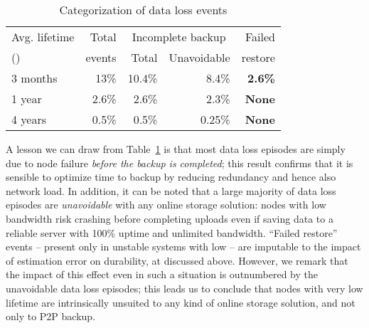 \begin{table}
\centering

\caption{Categorization of data loss events}
\label{tab:dataloss}
\begin{tabular}{|l||r||r|r|r|}
\hline
Avg. lifetime & Total & \multicolumn{2}{|c|}{Incomplete backup} &Failed \\
\cline{3-4}
()         & events       & Total  & Unavoidable&restore \\
\hline
\hline

3 months & 13\% & 10.4\% & 8.4\%  & \textbf{2.6\%} \\

\hline


1 year & 2.6\%  & 2.6\% & 2.3\% & \textbf{None} \\

\hline

4 years & 0.5\%  & 0.5\% & 0.25\% & \textbf{None} \\

\hline

\end{tabular}
\end{table}

A lesson we can draw from Table~\ref{tab:dataloss} is that most data
loss episodes are simply due to node failure \emph{before the backup
is completed}; this result confirms that it is sensible to optimize
time to backup by reducing redundancy and hence also network load. In
addition, it can be noted that a large majority of data loss episodes
are \emph{unavoidable} with any online storage solution: nodes with
low bandwidth risk crashing before completing uploads even if saving
data to a reliable server with 100\% uptime and unlimited bandwidth.
``Failed restore'' events -- present only in unstable systems with low
 -- are imputable to the impact of estimation error on
durability, at discussed above. However, we remark that the impact of
this effect even in such a situation is outnumbered by the unavoidable
data loss episodes; this leads us to conclude that nodes with very low
lifetime are intrinsically unsuited to any kind of online storage
solution, and not only to P2P backup.




